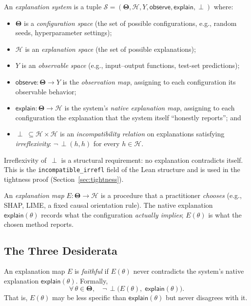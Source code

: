 \documentclass[twoside]{jmlr}
\newcommand{\Params}{\mathbf{\Theta}}         %
\newcommand{\sH}{\mathcal{H}}
\newcommand{\incomp}{\perp}                  %
\begin{document}
\begin{definition}
\label{def:explanation-system}
An \emph{explanation system} is a tuple
$\mathcal{S} = (\Params, \sH, Y, \mathsf{observe}, \mathsf{explain}, \incomp)$ where:
\begin{itemize}
  \item $\Params$ is a \emph{configuration space} (the set of possible
    configurations, e.g., random seeds, hyperparameter settings);
  \item $\sH$ is an \emph{explanation space} (the set of possible explanations);
  \item $Y$ is an \emph{observable space} (e.g., input--output functions,
    test-set predictions);
  \item $\mathsf{observe}: \Params \to Y$ is the \emph{observation map}, assigning
    to each configuration its observable behavior;
  \item $\mathsf{explain}: \Params \to \sH$ is the system's \emph{native
    explanation map}, assigning to each configuration the explanation that the
    system itself ``honestly reports''; and
  \item $\incomp\;\subseteq \sH \times \sH$ is an \emph{incompatibility relation}
    on explanations satisfying \emph{irreflexivity}:
    $\neg\,\incomp(h, h)$ for every $h \in \sH$.
\end{itemize}
\end{definition}

Irreflexivity of~$\incomp$ is a structural requirement: no explanation
contradicts itself.  This is the \texttt{incompatible\_irrefl} field of the
Lean structure and is used in the tightness proof
(Section~\ref{sec:tightness}).

An \emph{explanation map} $E : \Params \to \sH$ is a procedure that a
practitioner \emph{chooses} (e.g., SHAP, LIME, a fixed causal orientation
rule).  The native explanation $\mathsf{explain}(\theta)$ records what the
configuration \emph{actually implies}; $E(\theta)$ is what the chosen method
reports.

\subsection{The Three Desiderata}

\begin{definition}[Faithful]
\label{def:faithful}
An explanation map $E$ is \emph{faithful} if $E(\theta)$ never contradicts the
system's native explanation $\mathsf{explain}(\theta)$.  Formally,
\[
  \forall\,\theta \in \Params,\quad
  \neg\,\incomp\bigl(E(\theta),\;\mathsf{explain}(\theta)\bigr).
\]
That is, $E(\theta)$ may be less specific than $\mathsf{explain}(\theta)$ but
never disagrees with it.
\end{definition}
\end{document}
